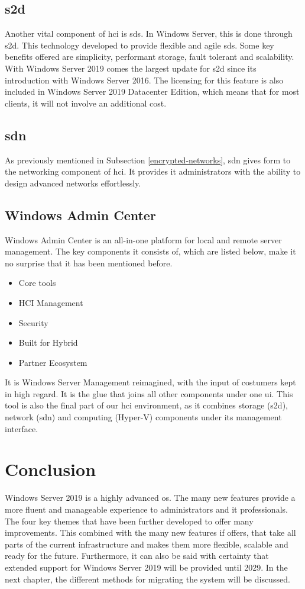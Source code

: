 \subsection{\acrfull{s2d}}
Another vital component of \acrshort{hci} is \acrfull{sds}. In Windows Server, this is done through \acrshort{s2d}. This technology developed to provide flexible and agile \acrshort{sds}. Some key benefits offered are simplicity, performant storage, fault tolerant and scalability. With Windows Server 2019 comes the largest update for \acrshort{s2d} since its introduction with Windows Server 2016. The licensing for this feature is also included in Windows Server 2019 Datacenter Edition, which means that for most clients, it will not involve an additional cost. \autocite{Gerend2018a}
\subsection{\acrshort{sdn}}
As previously mentioned in Subsection \ref{encrypted-networks}, \acrshort{sdn} gives form to the networking component of \acrshort{hci}. It provides \acrshort{it} administrators with the ability to design advanced networks effortlessly.
\subsection{Windows Admin Center}
Windows Admin Center is an all-in-one platform for local and remote server management. The key components it consists of, which are listed below, make it no surprise that it has been mentioned before. 
\begin{itemize}
	\item Core tools
	\item HCI Management
	\item Security
	\item Built for Hybrid
	\item Partner Ecosystem
\end{itemize}
It is Windows Server Management reimagined, with the input of costumers kept in high regard. It is the glue that joins all other components under one \acrfull{ui}. This tool is also the final part of our \acrshort{hci} environment, as it combines storage (\acrshort{s2d}), network (\acrshort{sdn}) and computing (Hyper-V) components under its management interface. 

\section{Conclusion}

Windows Server 2019 is a highly advanced \acrshort{os}. The many new features provide a more fluent and manageable experience to administrators and \acrshort{it} professionals. The four key themes that have been further developed to offer many improvements. This combined with the many new features if offers, that take all parts of the current infrastructure and makes them more flexible, scalable and ready for the future. Furthermore, it can also be said with certainty that extended support for Windows Server 2019 will be provided until 2029. In the next chapter, the different methods for migrating the system will be discussed.
